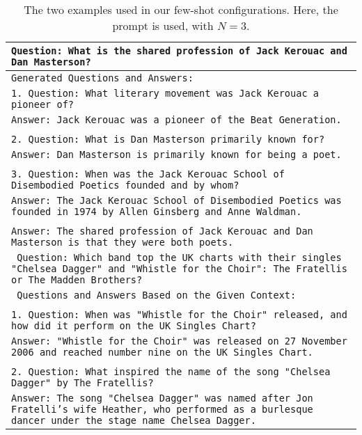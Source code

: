\begin{table*}
    \caption{The two examples used in our few-shot configurations. Here, the \rephrase{} prompt is used, with $N=3$.}
    \centering
    \small
    \begin{tabular}{>{\raggedright\arraybackslash\tt}p{}<{}}
      \toprule
      Question: What is the shared profession of Jack Kerouac and Dan Masterson? \\
      \midrule
      Generated Questions and Answers: \\
      1. Question: What literary movement was Jack Kerouac a pioneer of? \\
      Answer: Jack Kerouac was a pioneer of the Beat Generation. \\
 \\
      2. Question: What is Dan Masterson primarily known for? \\
      Answer: Dan Masterson is primarily known for being a poet. \\
 \\
      3. Question: When was the Jack Kerouac School of Disembodied Poetics founded and by whom? \\
      Answer: The Jack Kerouac School of Disembodied Poetics was founded in 1974 by Allen Ginsberg and Anne Waldman. \\
 \\
      Answer: The shared profession of Jack Kerouac and Dan Masterson is that they were both poets. \\
      \midrule
      Question: Which band top the UK charts with their singles "Chelsea Dagger" and "Whistle for the Choir": The Fratellis or The Madden Brothers? \\
      \midrule
      Questions and Answers Based on the Given Context: \\
 \\
      1. Question: When was "Whistle for the Choir" released, and how did it perform on the UK Singles Chart? \\
      Answer: "Whistle for the Choir" was released on 27 November 2006 and reached number nine on the UK Singles Chart. \\
 \\
      2. Question: What inspired the name of the song "Chelsea Dagger" by The Fratellis? \\
      Answer: The song "Chelsea Dagger" was named after Jon Fratelli's wife Heather, who performed as a burlesque dancer under the stage name Chelsea Dagger. \\

\end{tabular}
\end{table*}
